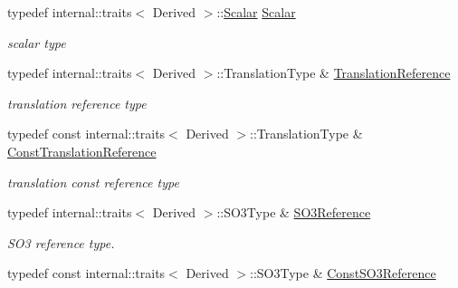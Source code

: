 \begin{DoxyCompactItemize}
\item 
typedef internal\+::traits$<$ Derived $>$\+::\hyperlink{class_sophus_1_1_s_e3_group_base_aa3db86a2cabe32d3c299dda41af181cc}{Scalar} \hyperlink{class_sophus_1_1_s_e3_group_base_aa3db86a2cabe32d3c299dda41af181cc}{Scalar}\hypertarget{class_sophus_1_1_s_e3_group_base_aa3db86a2cabe32d3c299dda41af181cc}{}\label{class_sophus_1_1_s_e3_group_base_aa3db86a2cabe32d3c299dda41af181cc}

\begin{DoxyCompactList}\small\item\em scalar type \end{DoxyCompactList}\item 
typedef internal\+::traits$<$ Derived $>$\+::Translation\+Type \& \hyperlink{class_sophus_1_1_s_e3_group_base_a132e7fc1322c47cedd1f1bbed592e64e}{Translation\+Reference}\hypertarget{class_sophus_1_1_s_e3_group_base_a132e7fc1322c47cedd1f1bbed592e64e}{}\label{class_sophus_1_1_s_e3_group_base_a132e7fc1322c47cedd1f1bbed592e64e}

\begin{DoxyCompactList}\small\item\em translation reference type \end{DoxyCompactList}\item 
typedef const internal\+::traits$<$ Derived $>$\+::Translation\+Type \& \hyperlink{class_sophus_1_1_s_e3_group_base_a0244af65402395137db21fe8ce013097}{Const\+Translation\+Reference}\hypertarget{class_sophus_1_1_s_e3_group_base_a0244af65402395137db21fe8ce013097}{}\label{class_sophus_1_1_s_e3_group_base_a0244af65402395137db21fe8ce013097}

\begin{DoxyCompactList}\small\item\em translation const reference type \end{DoxyCompactList}\item 
typedef internal\+::traits$<$ Derived $>$\+::S\+O3\+Type \& \hyperlink{class_sophus_1_1_s_e3_group_base_a33db661528fe06afc4d597c5c3c1f85d}{S\+O3\+Reference}\hypertarget{class_sophus_1_1_s_e3_group_base_a33db661528fe06afc4d597c5c3c1f85d}{}\label{class_sophus_1_1_s_e3_group_base_a33db661528fe06afc4d597c5c3c1f85d}

\begin{DoxyCompactList}\small\item\em S\+O3 reference type. \end{DoxyCompactList}\item 
typedef const internal\+::traits$<$ Derived $>$\+::S\+O3\+Type \& \hyperlink{class_sophus_1_1_s_e3_group_base_ad2e613f34fbfff912b6b0ccf1fb5f987}{Const\+S\+O3\+Reference}\hypertarget{class_sophus_1_1_s_e3_group_base_ad2e613f34fbfff912b6b0ccf1fb5f987}{}\label{class_sophus_1_1_s_e3_group_base_ad2e613f34fbfff912b6b0ccf1fb5f987}


\end{DoxyCompactItemize}
